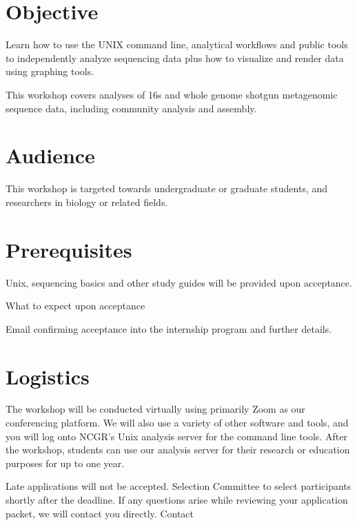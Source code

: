 \documentclass[
]{book}
\begin{document}
\hypertarget{objective-2}{%
\section*{Objective}\label{objective-2}}

Learn how to use the UNIX command line, analytical workflows and public tools to independently analyze sequencing data plus how to visualize and render data using graphing tools.

This workshop covers analyses of 16s and whole genome shotgun metagenomic sequence data, including community analysis and assembly.

\hypertarget{audience-2}{%
\section*{Audience}\label{audience-2}}

This workshop is targeted towards undergraduate or graduate students, and researchers in biology or related fields.

\hypertarget{prerequisites-2}{%
\section*{Prerequisites}\label{prerequisites-2}}

Unix, sequencing basics and other study guides will be provided upon acceptance.

What to expect upon acceptance

Email confirming acceptance into the internship program and further details.

\hypertarget{logistics-2}{%
\section*{Logistics}\label{logistics-2}}

The workshop will be conducted virtually using primarily Zoom as our conferencing platform. We will also use a variety of other software and tools, and you will log onto NCGR's Unix analysis server for the command line tools. After the workshop, students can use our analysis server for their research or education purposes for up to one year.

Late applications will not be accepted. Selection Committee to select participants shortly after the deadline. If any questions arise while reviewing your application packet, we will contact you directly.
Contact
\end{document}
